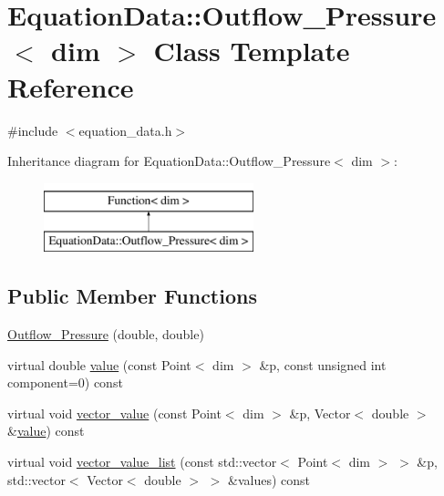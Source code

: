 \hypertarget{class_equation_data_1_1_outflow___pressure}{}\section{Equation\+Data\+:\+:Outflow\+\_\+\+Pressure$<$ dim $>$ Class Template Reference}
\label{class_equation_data_1_1_outflow___pressure}


{\ttfamily \#include $<$equation\+\_\+data.\+h$>$}

Inheritance diagram for Equation\+Data\+:\+:Outflow\+\_\+\+Pressure$<$ dim $>$\+:\begin{figure}[H]
\begin{center}
\leavevmode
\includegraphics[height=2.000000cm]{class_equation_data_1_1_outflow___pressure}
\end{center}
\end{figure}
\subsection*{Public Member Functions}
\begin{DoxyCompactItemize}
\item 
\hyperlink{class_equation_data_1_1_outflow___pressure_a39cac043cd06378017efd9f9dfc2d40b}{Outflow\+\_\+\+Pressure} (double, double)
\item 
virtual double \hyperlink{class_equation_data_1_1_outflow___pressure_a48baf3b5f5a0b2ae4cdefeb62b429ca6}{value} (const Point$<$ dim $>$ \&p, const unsigned int component=0) const 
\item 
virtual void \hyperlink{class_equation_data_1_1_outflow___pressure_a430252223a17d71b8e10f76fb4bce313}{vector\+\_\+value} (const Point$<$ dim $>$ \&p, Vector$<$ double $>$ \&\hyperlink{class_equation_data_1_1_outflow___pressure_a48baf3b5f5a0b2ae4cdefeb62b429ca6}{value}) const 
\item 
virtual void \hyperlink{class_equation_data_1_1_outflow___pressure_a31c63da8138ec9837790878952008ba9}{vector\+\_\+value\+\_\+list} (const std\+::vector$<$ Point$<$ dim $>$ $>$ \&p, std\+::vector$<$ Vector$<$ double $>$ $>$ \&values) const 
\end{DoxyCompactItemize}
